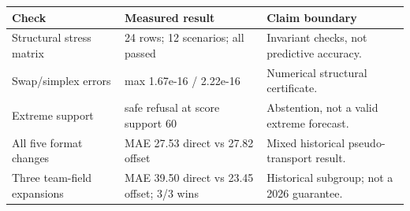 \begin{tabularx}{\linewidth}{@{}lY Y@{}}
\toprule
Check & Measured result & Claim boundary \\
\midrule
Structural stress matrix & 24 rows; 12 scenarios; all passed & Invariant checks, not predictive accuracy. \\
Swap/simplex errors & max 1.67e-16 / 2.22e-16 & Numerical structural certificate. \\
Extreme support & safe refusal at score support 60 & Abstention, not a valid extreme forecast. \\
All five format changes & MAE 27.53 direct vs 27.82 offset & Mixed historical pseudo-transport result. \\
Three team-field expansions & MAE 39.50 direct vs 23.45 offset; 3/3 wins & Historical subgroup; not a 2026 guarantee. \\
\bottomrule
\end{tabularx}
